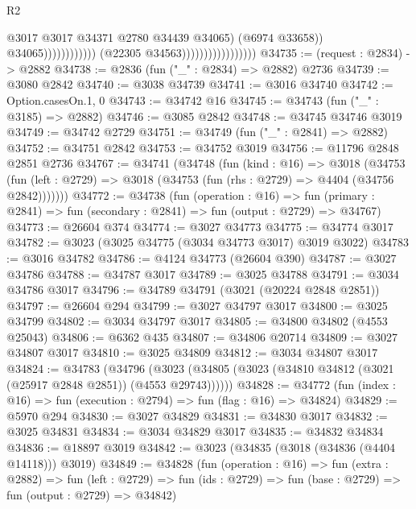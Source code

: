 \begin{lexlean}{R2}
\begin{coremodule}
                                                                @3017
                                                                @3017
                                                                @34371
                                                                @2780
                                                                @34439
                                                                @34065)
                                                              (@6974 @33658))
                                                            @34065))))))))))))
                                    (@22305 @34563)))))))))))))))))
@34735 := (request : @2834) -> @2882
@34738 := @2836 (fun ("_" : @2834) => @2882) @2736
@34739 := @3080 @2842
@34740 := @3038 @34739
@34741 := @3016 @34740
@34742 := Option.casesOn.{1, 0}
@34743 := @34742 @16
@34745 := @34743 (fun ("_" : @3185) => @2882)
@34746 := @3085 @2842
@34748 := @34745 @34746 @3019
@34749 := @34742 @2729
@34751 := @34749 (fun ("_" : @2841) => @2882)
@34752 := @34751 @2842
@34753 := @34752 @3019
@34756 := @11796 @2848 @2851 @2736
@34767 := @34741
    (@34748
      (fun (kind : @16) =>
      @3018
        (@34753
          (fun (left : @2729) => @3018 (@34753 (fun (rhs : @2729) => @4404 (@34756 @2842)))))))
@34772 := @34738
    (fun (operation : @16) =>
    fun (primary : @2841) => fun (secondary : @2841) => fun (output : @2729) => @34767)
@34773 := @26604 @374
@34774 := @3027 @34773
@34775 := @34774 @3017
@34782 := @3023 (@3025 @34775 (@3034 @34773 @3017) @3019 @3022)
@34783 := @3016 @34782
@34786 := @4124 @34773 (@26604 @390)
@34787 := @3027 @34786
@34788 := @34787 @3017
@34789 := @3025 @34788
@34791 := @3034 @34786 @3017
@34796 := @34789 @34791 (@3021 (@20224 @2848 @2851))
@34797 := @26604 @294
@34799 := @3027 @34797 @3017
@34800 := @3025 @34799
@34802 := @3034 @34797 @3017
@34805 := @34800 @34802 (@4553 @25043)
@34806 := @6362 @435
@34807 := @34806 @20714
@34809 := @3027 @34807 @3017
@34810 := @3025 @34809
@34812 := @3034 @34807 @3017
@34824 := @34783
    (@34796 (@3023 (@34805 (@3023 (@34810 @34812 (@3021 (@25917 @2848 @2851)) (@4553 @29743))))))
@34828 := @34772 (fun (index : @16) => fun (execution : @2794) => fun (flag : @16) => @34824)
@34829 := @5970 @294
@34830 := @3027 @34829
@34831 := @34830 @3017
@34832 := @3025 @34831
@34834 := @3034 @34829 @3017
@34835 := @34832 @34834
@34836 := @18897 @3019
@34842 := @3023 (@34835 (@3018 (@34836 (@4404 @14118))) @3019)
@34849 := @34828
    (fun (operation : @16) =>
    fun (extra : @2882) =>
    fun (left : @2729) => fun (ids : @2729) => fun (base : @2729) => fun (output : @2729) => @34842)

\end{coremodule}
\end{lexlean}
